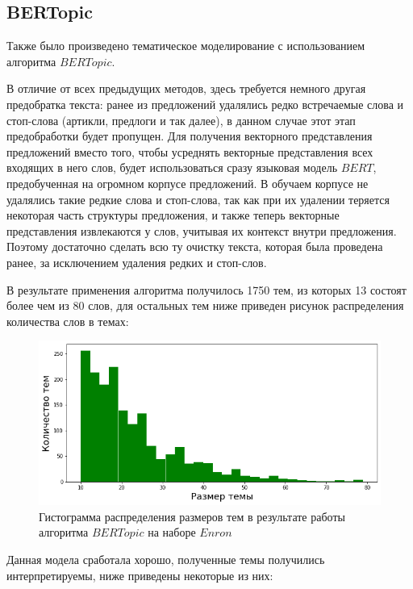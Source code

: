 \subsection{BERTopic}

Также было произведено тематическое моделирование с использованием алгоритма $BERTopic$.

В отличие от всех предыдущих методов, здесь требуется немного другая предобратка текста: 
ранее из предложений удалялись редко встречаемые слова и стоп-слова (артикли, предлоги 
и так далее), в данном случае этот этап предобработки будет пропущен. Для получения векторного представления предложений вместо того, чтобы усреднять 
векторные представления всех входящих в него слов, будет использоваться сразу языковая модель $BERT$, предобученная на огромном корпусе предложений. В обучаем корпусе не удалялись такие редкие слова и стоп-слова, так как при их удалении теряется некоторая часть структуры предложения, и также теперь векторные представления извлекаются у слов, учитывая их контекст внутри предложения. Поэтому достаточно сделать всю ту очистку текста, 
которая была проведена ранее, за исключением удаления редких и стоп-слов.

В результате применения алгоритма получилось 1750 тем, из которых 13 состоят более чем
из 80 слов, для остальных тем ниже приведен рисунок распределения количества слов в темах:

\begin{figure}[H]
\centering
\includegraphics[scale=0.7]{pics/bert-size-distrib.png}
\caption{Гистограмма распределения размеров тем в результате работы алгоритма $BERTopic$
на наборе $Enron$}
\end{figure}

Данная модела сработала хорошо, полученные темы получились интерпретируемы, ниже приведены некоторые из них:

